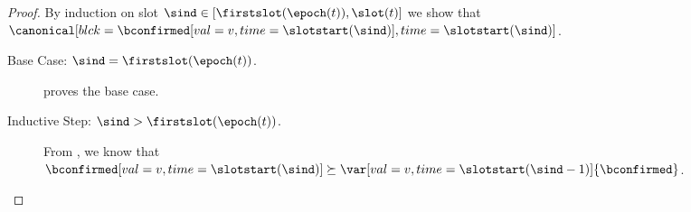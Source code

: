 \documentclass{article}
\begin{document}
\begin{proof}
    By induction on slot $\sind \in [\firstslot(\epoch(t)),\slot(t)]$ we show that\\ $\canonical[blck={\bconfirmed[val=v,time=\slotstart(\sind)]},time=\slotstart(\sind)]$.
    
    \begin{description}
        \item[Base Case: $\sind = \firstslot(\epoch(t))$.]   proves the base case.
    
        \item[Inductive Step: $\sind > \firstslot(\epoch(t))$.] 
        
        From , we know that $\bconfirmed[val=v,time=\slotstart(\sind)] \succeq \var[val=v,time=\slotstart(\sind-1)]{\bconfirmed}$.



\end{description}
\end{proof}
\end{document}

